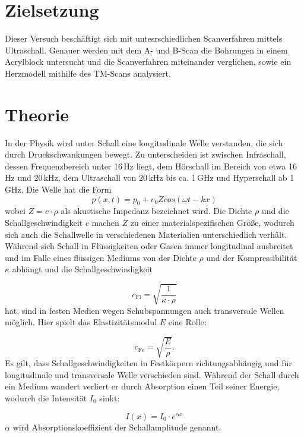 \section{Zielsetzung}
Dieser Versuch beschäftigt sich mit untesrschiedlichen Scanverfahren mittels Ultraschall. Genauer werden mit dem A- und B-Scan die Bohrungen in einem Acrylblock untersucht und die Scanverfahren miteinander verglichen, sowie ein 
Herzmodell mithilfe des TM-Scans analysiert.

\section{Theorie}
In der Physik wird unter Schall eine longitudinale Welle verstanden, die sich durch Druckschwankungen bewegt. Zu unterscheiden ist zwischen Infraschall, dessen Frequenzbereich unter 16\,Hz liegt, dem Hörschall im Bereich von 
etwa 16\,Hz und 20\,kHz, dem Ultraschall von 20\,kHz bis ca. 1\,GHz und Hyperschall ab 1\,GHz.
Die Welle hat die Form
\begin{equation}
p(x,t) = p_0 + v_0 Z cos(\omega t - kx)
\end{equation}
wobei $Z = c\cdot \rho$ als akustische Impedanz bezeichnet wird. Die Dichte $\rho$ und die Schallgeschwindigkeit $c$ machen $Z$ zu einer materialspezifischen Größe, wodurch sich auch die Schallwelle in verschiedenen Materialien 
unterschiedlich verhält. Während sich Schall in Flüssigkeiten oder Gasen immer longitudinal ausbreitet und im Falle eines flüssigen Mediums von der Dichte $\rho$ und der Kompressibilität $\kappa$ abhängt und die Schallgeschwindigkeit

\begin{equation}
c_{\text{Fl}} = \sqrt{\frac{1}{\kappa \cdot \rho}}
\end{equation}
hat, sind in festen Medien wegen Schubspannungen auch transversale Wellen möglich. Hier spielt das Elastizitätsmodul $E$ eine Rolle:

\begin{equation}
c_{\text{Fe}} = \sqrt{\frac{E}{\rho}}.
\end{equation}
Es gilt, dass Schallgeschwindigkeiten in Festkörpern richtungsabhängig und für longitudinale und transversale Welle verschieden sind.
Während der Schall durch ein Medium wandert verliert er durch Absorption einen Teil seiner Energie, wodurch die Intensität $I_0$ sinkt:

\begin{equation}
I(x) = I_0\cdot e^{\alpha x}
\end{equation}
$\alpha$ wird Absorptionskoeffizient der Schallamplitude genannt. 

